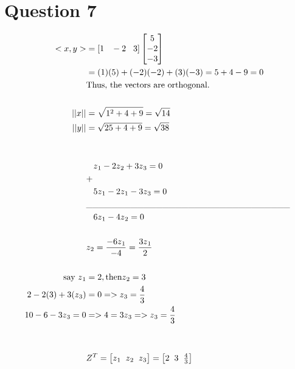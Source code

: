 \documentclass{article}
\begin{document}
\section{Question 7}
\begin{align*}
    <x, y> &= [1 \hspace{3mm}-2 \hspace{3mm} 3]\begin{bmatrix}5 \\ -2 \\ -3\end{bmatrix}
    \\ &= (1)(5) + (-2)(-2) + (3)(-3) = 5 + 4 - 9 = 0 \\ &\text{Thus, the vectors are orthogonal.} \\ 
    \\ ||x|| &= \sqrt{1^2 + 4 + 9} = \sqrt{14} 
    \\ ||y|| &= \sqrt{25 + 4 + 9} = \sqrt{38}
    \\ \\ \\ 
    &\hspace{3mm}z\textsubscript1 - 2z\textsubscript2 + 3z\textsubscript3 = 0\\
    &+ \\ 
    &\hspace{3mm}5z\textsubscript1 - 2z\textsubscript1 - 3z\textsubscript3 = 0 \\
    &\_\_\_\_\_\_\_\_\_\_\_\_\_\_\_\_\_\_\_\_\_\_\_\_\_\_\_\_\_\_\_\_ 
    \\ &\hspace{3mm}6z\textsubscript1 - 4z\textsubscript2 = 0
    \\ \\ & z\textsubscript2 =\frac{-6z\textsubscript1}{-4} = \frac{3z\textsubscript1}{2}
    \\ \\ \text{say } z\textsubscript1 &= 2, \text{then} z\textsubscript2 = 3 \\ 
    2 - 2(3) + 3(z\textsubscript3) &= 0 => z\textsubscript3 = \frac{4}{3} \\ 
    10 - 6 - 3z\textsubscript3 = 0 &=> 4 = 3z\textsubscript3 => z\textsubscript3 = \frac{4}{3} \\ \\ \\ 
    &Z^{T} = \begin{bmatrix}z\textsubscript1 \hspace{2mm}z\textsubscript2\hspace{2mm} z\textsubscript3\end{bmatrix} = \begin{bmatrix}2\hspace{2mm}3\hspace{2mm}\frac{4}{3}\end{bmatrix} \\ \\ \\ 

\end{align*}
\end{document}
